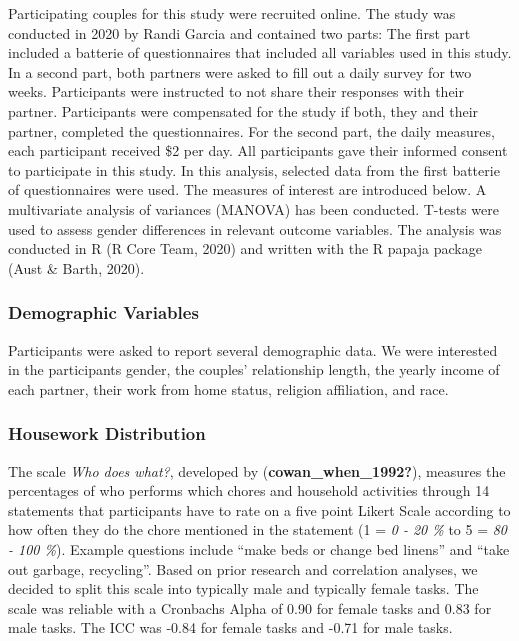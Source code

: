 \documentclass[
  man]{apa6}
\begin{document}
Participating couples for this study were recruited online. The study was conducted in 2020 by Randi Garcia and contained two parts: The first part included a batterie of questionnaires that included all variables used in this study. In a second part, both partners were asked to fill out a daily survey for two weeks. Participants were instructed to not share their responses with their partner. Participants were compensated for the study if both, they and their partner, completed the questionnaires. For the second part, the daily measures, each participant received \$2 per day. All participants gave their informed consent to participate in this study.
In this analysis, selected data from the first batterie of questionnaires were used. The measures of interest are introduced below.
A multivariate analysis of variances (MANOVA) has been conducted. T-tests were used to assess gender differences in relevant outcome variables.
The analysis was conducted in R (R Core Team, 2020) and written with the R papaja package (Aust \& Barth, 2020).

\hypertarget{demographic-variables}{%
\subsubsection{Demographic Variables}\label{demographic-variables}}

Participants were asked to report several demographic data. We were interested in the participants gender, the couples' relationship length, the yearly income of each partner, their work from home status, religion affiliation, and race.

\hypertarget{housework-distribution}{%
\subsubsection{Housework Distribution}\label{housework-distribution}}

The scale \emph{Who does what?}, developed by (\textbf{cowan\_when\_1992?}), measures the percentages of who performs which chores and household activities through 14 statements that participants have to rate on a five point Likert Scale according to how often they do the chore mentioned in the statement (1 = \emph{0 - 20 \%} to 5 = \emph{80 - 100 \%}). Example questions include ``make beds or change bed linens'' and ``take out garbage, recycling''. Based on prior research and correlation analyses, we decided to split this scale into typically male and typically female tasks. The scale was reliable with a Cronbachs Alpha of 0.90 for female tasks and 0.83 for male tasks. The ICC was -0.84 for female tasks and -0.71 for male tasks.
\end{document}
